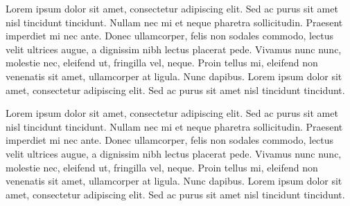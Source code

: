 \documentclass[a4paper]{article}
\begin{document}
\noindent
Lorem ipsum dolor sit amet, consectetur adipiscing elit. Sed ac purus sit amet
nisl tincidunt tincidunt. Nullam nec mi et neque pharetra sollicitudin. Praesent
imperdiet mi nec ante. Donec ullamcorper, felis non sodales commodo, lectus velit
ultrices augue, a dignissim nibh lectus placerat pede. Vivamus nunc nunc, molestie
nec, eleifend ut, fringilla vel, neque. Proin tellus mi, eleifend non venenatis
sit amet, ullamcorper at ligula. Nunc dapibus. Lorem ipsum dolor sit amet,
consectetur adipiscing elit. Sed ac purus sit amet nisl tincidunt tincidunt.

\begin{figure}[H]
  \centering
  \hspace{1cm}
\end{figure}

\noindent
Lorem ipsum dolor sit amet, consectetur adipiscing elit. Sed ac purus sit amet
nisl tincidunt tincidunt. Nullam nec mi et neque pharetra sollicitudin. Praesent
imperdiet mi nec ante. Donec ullamcorper, felis non sodales commodo, lectus velit
ultrices augue, a dignissim nibh lectus placerat pede. Vivamus nunc nunc, molestie
nec, eleifend ut, fringilla vel, neque. Proin tellus mi, eleifend non venenatis
sit amet, ullamcorper at ligula. Nunc dapibus. Lorem ipsum dolor sit amet,
consectetur adipiscing elit. Sed ac purus sit amet nisl tincidunt tincidunt.
\end{document}
